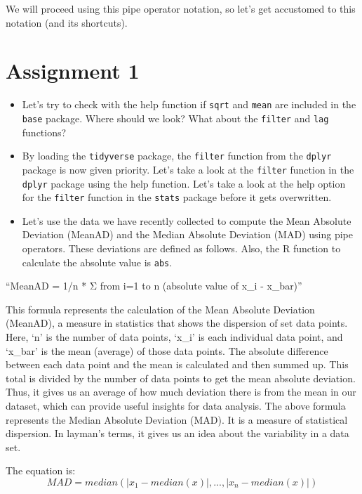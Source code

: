 \documentclass[
  a4paper,
]{book}
\providecommand{\tightlist}{%
  \setlength{\itemsep}{0pt}\setlength{\parskip}{0pt}}\usepackage{longtable,booktabs,array}
\begin{document}
We will proceed using this pipe operator notation, so let's get
accustomed to this notation (and its shortcuts).

\section{Assignment 1}\label{assignment-1-1}

\begin{itemize}
\tightlist
\item
  Let's try to check with the help function if \texttt{sqrt} and
  \texttt{mean} are included in the \texttt{base} package. Where should
  we look? What about the \texttt{filter} and \texttt{lag} functions?
\item
  By loading the \texttt{tidyverse} package, the \texttt{filter}
  function from the \texttt{dplyr} package is now given priority. Let's
  take a look at the \texttt{filter} function in the \texttt{dplyr}
  package using the help function. Let's take a look at the help option
  for the \texttt{filter} function in the \texttt{stats} package before
  it gets overwritten.
\item
  Let's use the data we have recently collected to compute the Mean
  Absolute Deviation (MeanAD) and the Median Absolute Deviation (MAD)
  using pipe operators. These deviations are defined as follows. Also,
  the R function to calculate the absolute value is \texttt{abs}.
\end{itemize}

``MeanAD = 1/n * Σ from i=1 to n (absolute value of x\_i - x\_bar)''

This formula represents the calculation of the Mean Absolute Deviation
(MeanAD), a measure in statistics that shows the dispersion of set data
points. Here, `n' is the number of data points, `x\_i' is each
individual data point, and `x\_bar' is the mean (average) of those data
points. The absolute difference between each data point and the mean is
calculated and then summed up. This total is divided by the number of
data points to get the mean absolute deviation. Thus, it gives us an
average of how much deviation there is from the mean in our dataset,
which can provide useful insights for data analysis. The above formula
represents the Median Absolute Deviation (MAD). It is a measure of
statistical dispersion. In layman's terms, it gives us an idea about the
variability in a data set.

The equation is: \[MAD= median(|x_1-median(x)|,...,|x_n-median(x)|)\]
\end{document}
